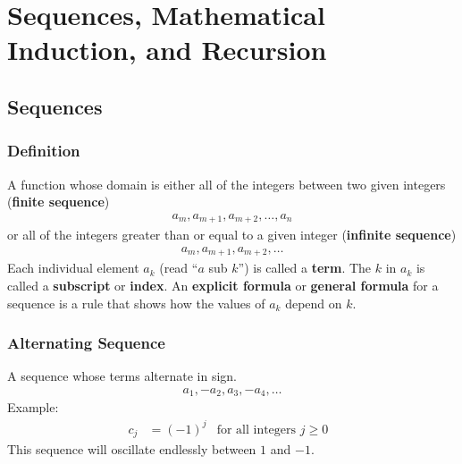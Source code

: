 \section{Sequences, Mathematical Induction, and Recursion}
% 
\subsection{Sequences}
% 
\subsubsection{Definition}
A function whose domain is either all of the integers between two given integers (\textbf{finite sequence})
\begin{align*}
    a_m, a_{m+1}, a_{m+2}, \dots, a_n
\end{align*}
or all of the integers greater than or equal to a given integer (\textbf{infinite sequence})
\begin{align*}
    a_m, a_{m+1}, a_{m+2}, \dots
\end{align*}
Each individual element $a_k$ (read ``$a$ sub $k$'') is called a \textbf{term}. The $k$ in $a_k$ is called a \textbf{subscript} or \textbf{index}.
An \textbf{explicit formula} or \textbf{general formula} for a sequence is a rule that shows how the values of $a_k$ depend on $k$.
\subsubsection{Alternating Sequence}
A sequence whose terms alternate in sign.
\begin{align*}
    a_1, -a_2, a_3, -a_4, \dots
\end{align*}
Example:
\begin{align*}
    c_j &= (-1)^j & \text{for all integers $j \geq 0$ }
\end{align*}
This sequence will oscillate endlessly between $1$ and $-1$.
% 
\newpage

